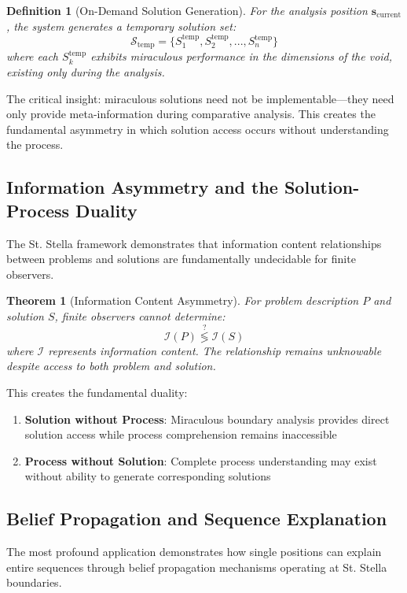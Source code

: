 \documentclass[12pt,a4paper]{article}
\newtheorem{theorem}{Theorem}
\newtheorem{definition}{Definition}
\begin{document}
\begin{definition}[On-Demand Solution Generation]
For the analysis position $\mathbf{s}_{\text{current}}$, the system generates a temporary solution set:
$$\mathcal{S}_{\text{temp}} = \{S_1^{\text{temp}}, S_2^{\text{temp}}, ..., S_n^{\text{temp}}\}$$
where each $S_k^{\text{temp}}$ exhibits miraculous performance in the dimensions of the void, existing only during the analysis.
\end{definition}

The critical insight: miraculous solutions need not be implementable—they need only provide meta-information during comparative analysis. This creates the fundamental asymmetry in which solution access occurs without understanding the process.

\subsection{Information Asymmetry and the Solution-Process Duality}

The St. Stella framework demonstrates that information content relationships between problems and solutions are fundamentally undecidable for finite observers.

\begin{theorem}[Information Content Asymmetry]
For problem description $P$ and solution $S$, finite observers cannot determine:
$$\mathcal{I}(P) \stackrel{?}{\lessgtr} \mathcal{I}(S)$$
where $\mathcal{I}$ represents information content. The relationship remains unknowable despite access to both problem and solution.
\end{theorem}

This creates the fundamental duality:
\begin{enumerate}
\item \textbf{Solution without Process}: Miraculous boundary analysis provides direct solution access while process comprehension remains inaccessible
\item \textbf{Process without Solution}: Complete process understanding may exist without ability to generate corresponding solutions
\end{enumerate}

\subsection{Belief Propagation and Sequence Explanation}

The most profound application demonstrates how single positions can explain entire sequences through belief propagation mechanisms operating at St. Stella boundaries.
\end{document}

